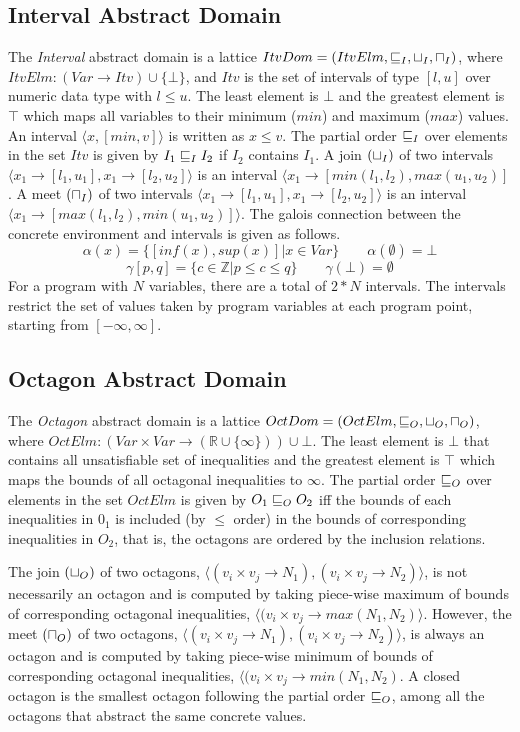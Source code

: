 \subsection{Interval Abstract Domain}
The {\em Interval} abstract domain is a lattice 
$ItvDom = (ItvElm, \sqsubseteq_{I}, \sqcup_{I}, \sqcap_{I})$, where
$ItvElm: (Var \rightarrow Itv) \cup \{\bot\}$, and $Itv$ is 
the set of intervals of type $[l,u]$ over numeric data 
type with $l \leq u$. The least element is $\bot$ and the 
greatest element is $\top$ which maps all variables to their
minimum ($min$) and maximum ($max$) values.  An interval 
$\langle x, [min, v] \rangle$ is written as $x \leq v$.  The 
partial order $\sqsubseteq_{I}$ over elements in the set $Itv$ is 
given by $I_1 \sqsubseteq_{I} I_2$ if $I_2$ contains $I_1$.
A join $(\sqcup_{I})$ of two intervals $\langle x_1 \rightarrow [l_1, u_1], 
x_1 \rightarrow [l_2, u_2] \rangle$ is an interval 
$\langle x_1 \rightarrow [min(l_1, l_2), max(u_1, u_2)]$.
A meet $(\sqcap_{I})$ of two intervals $\langle x_1 \rightarrow [l_1, u_1], 
x_1 \rightarrow [l_2, u_2] \rangle$ is an interval 
$\langle x_1 \rightarrow [max(l_1, l_2), min(u_1, u_2)] \rangle$.
The galois connection between the concrete environment and intervals is 
given as follows.
\[\alpha(x) = \{[inf(x), sup(x)] | x \in Var\} \qquad   \alpha(\emptyset) = \bot \]
\[\gamma[p,q] = \{c \in \mathbb{Z} | p \leq c \leq q\} \qquad \gamma(\bot) = \emptyset \]
For a program with $N$ variables, there are a total of 
$2*N$ intervals. The intervals restrict the set of values 
taken by program variables at each program point, starting 
from $[-\infty, \infty]$.   

\subsection{Octagon Abstract Domain}
The {\em Octagon} abstract domain is a lattice 
$OctDom = (OctElm, \sqsubseteq_{O}, \sqcup_{O}, \sqcap_{O})$, where
$OctElm: (Var \times Var \rightarrow (\mathbb{R} \cup \{\infty\})) \cup \bot$. 
The least element is $\bot$ that contains all unsatisfiable 
set of inequalities and the greatest element is $\top$ which 
maps the bounds of all octagonal inequalities to $\infty$. 
The partial order $\sqsubseteq_{O}$ over elements in the set $OctElm$ is 
given by $O_1 \sqsubseteq_{O} O_2$ iff the bounds of each inequalities in $0_1$ 
is included (by $\leq$ order) in the bounds of corresponding inequalities 
in $O_2$, that is, the octagons are ordered by the inclusion relations.

The join $(\sqcup_{O})$ of two octagons, $\langle (v_i \times v_j \rightarrow N_1),
(v_i \times v_j \rightarrow N_2) \rangle$, is not necessarily an octagon 
and is computed by taking piece-wise maximum of bounds of corresponding 
octagonal inequalities, $\langle (v_i \times v_j \rightarrow max(N_1, N_2) \rangle$.
However, the meet $(\sqcap_{O})$ of two octagons, $\langle (v_i \times v_j \rightarrow N_1),
(v_i \times v_j \rightarrow N_2) \rangle$, is always an octagon and is 
computed by taking piece-wise minimum of bounds of corresponding 
octagonal inequalities, $\langle (v_i \times v_j \rightarrow min(N_1, N_2)$.  A closed 
octagon is the smallest octagon following the partial order $\sqsubseteq_{O}$, among all 
the octagons that abstract the same concrete values.

